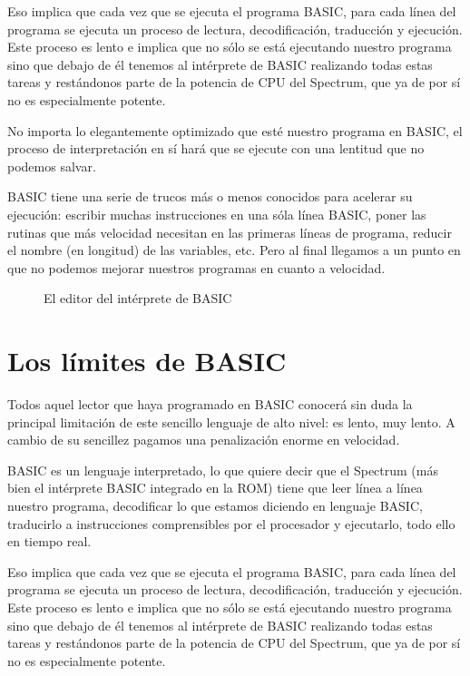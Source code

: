 \documentclass[letterpaper,10pt,spanish]{sphinxmanual}
\begin{document}
Eso implica que cada vez que se ejecuta el programa BASIC, para cada línea del programa se ejecuta un proceso de lectura, decodificación, traducción y ejecución. Este proceso es lento e implica que no sólo se está ejecutando nuestro programa sino que debajo de él tenemos al intérprete de BASIC realizando todas estas tareas y restándonos parte de la potencia de CPU del Spectrum, que ya de por sí no es especialmente potente.

No importa lo elegantemente optimizado que esté nuestro programa en BASIC, el proceso de interpretación en sí hará que se ejecute con una lentitud que no podemos salvar.

BASIC tiene una serie de trucos más o menos conocidos para acelerar su ejecución: escribir muchas instrucciones en una sóla línea BASIC, poner las rutinas que más velocidad necesitan en las primeras líneas de programa, reducir el nombre (en longitud) de las variables, etc. Pero al final llegamos a un punto en que no podemos mejorar nuestros programas en cuanto a velocidad.

\begin{figure}[htbp]
\centering
\capstart

\noindent{}
\caption{El editor del intérprete de BASIC}\label{\detokenize{02_introduccion/introduccion:id2}}\end{figure}


\section{Los límites de BASIC}
\label{\detokenize{02_introduccion/introduccion:id1}}
Todos aquel lector que haya programado en BASIC conocerá sin duda la principal limitación de este sencillo lenguaje de alto nivel: es lento, muy lento. A cambio de su sencillez pagamos una penalización enorme en velocidad.

BASIC es un lenguaje interpretado, lo que quiere decir que el Spectrum (más bien el intérprete BASIC integrado en la ROM) tiene que leer línea a línea nuestro programa, decodificar lo que estamos diciendo en lenguaje BASIC, traducirlo a instrucciones comprensibles por el procesador y ejecutarlo, todo ello en tiempo real.

Eso implica que cada vez que se ejecuta el programa BASIC, para cada línea del programa se ejecuta un proceso de lectura, decodificación, traducción y ejecución. Este proceso es lento e implica que no sólo se está ejecutando nuestro programa sino que debajo de él tenemos al intérprete de BASIC realizando todas estas tareas y restándonos parte de la potencia de CPU del Spectrum, que ya de por sí no es especialmente potente.
\end{document}
